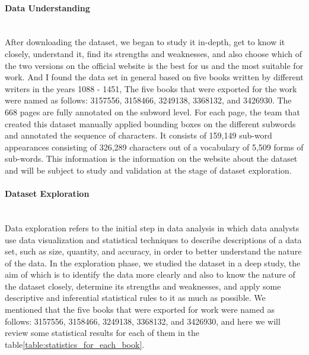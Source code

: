 \paragraph{Data Understanding}\mbox{}\\
After downloading the dataset, we began to study it in-depth, get to know it closely, understand it, find its strengths and weaknesses, and also choose which of the two versions on the official website is the best for us and the most suitable for work.
And I found the data set in general based on five books written by different writers in the years 1088 - 1451, The five books that were exported for the work were named as follows: 3157556, 3158466, 3249138, 3368132, and 3426930. The 668 pages are fully annotated on the subword level. For each page, the team that created this dataset manually applied bounding boxes on the different subwords and annotated the sequence of characters. It consists of 159,149 sub-word appearances consisting of 326,289 characters out of a vocabulary of 5,509 forms of sub-words.
This information is the information on the website about the dataset and will be subject to study and validation at the stage of dataset exploration.

\paragraph{Dataset Exploration}\mbox{}\\
Data exploration refers to the initial step in data analysis in which data analysts use data visualization and statistical techniques to describe descriptions of a data set, such as size, quantity, and accuracy, in order to better understand the nature of the data.
In the exploration phase, we studied the dataset in a deep study, the aim of which is to identify the data more clearly and also to know the nature of the dataset closely, determine its strengths and weaknesses, and apply some descriptive and inferential statistical rules to it as much as possible.
We mentioned that the five books that were exported for work were named as follows: 3157556, 3158466, 3249138, 3368132, and 3426930, and here we will review some statistical results for each of them in the table\ref{table:statistics_for_each_book}.

